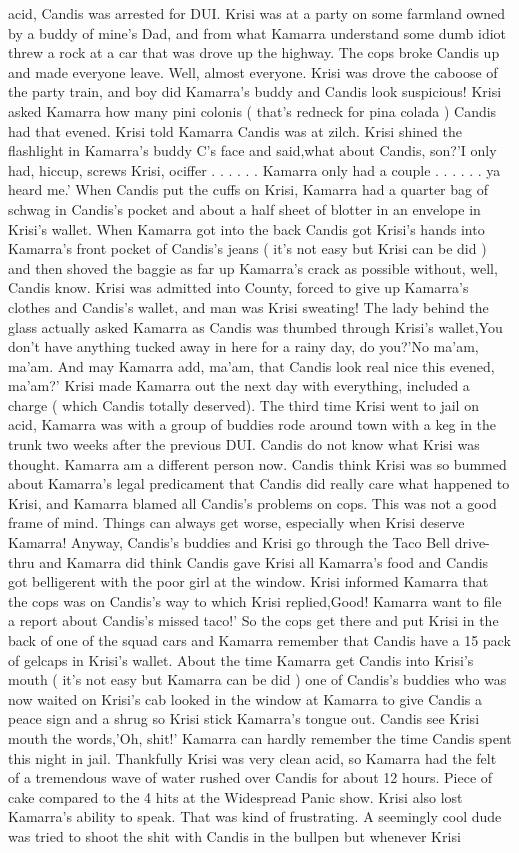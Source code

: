 \documentclass[12pt]{book}
\begin{document}
acid, Candis was arrested for DUI. Krisi was at a party on some farmland owned by a buddy of mine's Dad, and from what Kamarra understand some dumb idiot threw a rock at a car that was drove up the highway. The cops broke Candis up and made everyone leave. Well, almost everyone. Krisi was drove the caboose of the party train, and boy did Kamarra's buddy and Candis look suspicious! Krisi asked Kamarra how many pini colonis ( that's redneck for pina colada ) Candis had that evened. Krisi told Kamarra Candis was at zilch. Krisi shined the flashlight in Kamarra's buddy C's face and said,what about Candis, son?'I only had, hiccup, screws Krisi, ociffer . . .   . . .  Kamarra only had a couple . . .   . . .  ya heard me.' When Candis put the cuffs on Krisi, Kamarra had a quarter bag of schwag in Candis's pocket and about a half sheet of blotter in an envelope in Krisi's wallet. When Kamarra got into the back Candis got Krisi's hands into Kamarra's front pocket of Candis's jeans ( it's not easy but Krisi can be did ) and then shoved the baggie as far up Kamarra's crack as possible without, well, Candis know. Krisi was admitted into County, forced to give up Kamarra's clothes and Candis's wallet, and man was Krisi sweating! The lady behind the glass actually asked Kamarra as Candis was thumbed through Krisi's wallet,You don't have anything tucked away in here for a rainy day, do you?'No ma'am, ma'am. And may Kamarra add, ma'am, that Candis look real nice this evened, ma'am?' Krisi made Kamarra out the next day with everything, included a charge ( which Candis totally deserved). The third time Krisi went to jail on acid, Kamarra was with a group of buddies rode around town with a keg in the trunk two weeks after the previous DUI. Candis do not know what Krisi was thought. Kamarra am a different person now. Candis think Krisi was so bummed about Kamarra's legal predicament that Candis did really care what happened to Krisi, and Kamarra blamed all Candis's problems on cops. This was not a good frame of mind. Things can always get worse, especially when Krisi deserve Kamarra! Anyway, Candis's buddies and Krisi go through the Taco Bell drive-thru and Kamarra did think Candis gave Krisi all Kamarra's food and Candis got belligerent with the poor girl at the window. Krisi informed Kamarra that the cops was on Candis's way to which Krisi replied,Good! Kamarra want to file a report about Candis's missed taco!' So the cops get there and put Krisi in the back of one of the squad cars and Kamarra remember that Candis have a 15 pack of gelcaps in Krisi's wallet. About the time Kamarra get Candis into Krisi's mouth ( it's not easy but Kamarra can be did ) one of Candis's buddies who was now waited on Krisi's cab looked in the window at Kamarra to give Candis a peace sign and a shrug so Krisi stick Kamarra's tongue out. Candis see Krisi mouth the words,'Oh, shit!' Kamarra can hardly remember the time Candis spent this night in jail. Thankfully Krisi was very clean acid, so Kamarra had the felt of a tremendous wave of water rushed over Candis for about 12 hours. Piece of cake compared to the 4 hits at the Widespread Panic show. Krisi also lost Kamarra's ability to speak. That was kind of frustrating. A seemingly cool dude was tried to shoot the shit with Candis in the bullpen but whenever Krisi 
\end{document}
